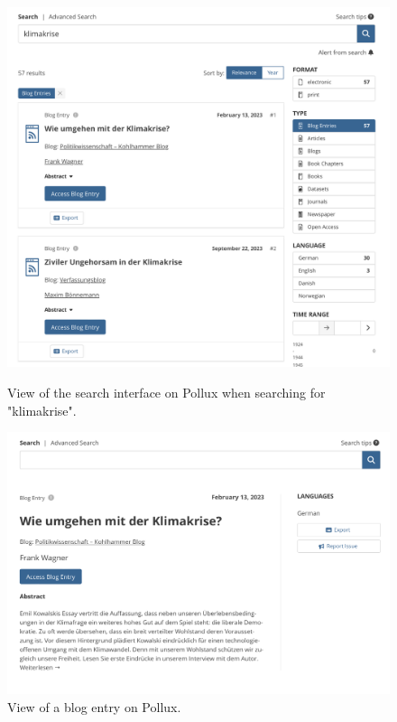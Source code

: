 \documentclass{article}
\begin{document}
\begin{figure}[ht]
	\centering
	\begin{minipage}[t]{0.45\textwidth}
		\centering
		\includegraphics[width=\textwidth]{figures/pollux_web_search_bar.png} %
		\caption{View of the search interface on Pollux when searching for "klimakrise".}
		\label{fig:pollux_web_search_bar}
	\end{minipage}\hfill
	\begin{minipage}[t]{0.45\textwidth}
		\centering
		\includegraphics[width=\textwidth]{figures/pollux_web_blog_entry.png} %
		\caption{View of a blog entry on Pollux.}
		\label{fig:pollux_web_blog_entry}
	\end{minipage}
\end{figure}
\end{document}
